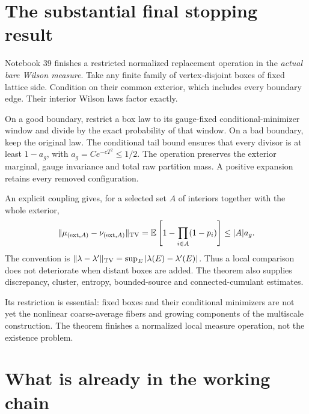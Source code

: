 \documentclass[11pt]{article}
\theoremstyle{remark}
\begin{document}
\section*{The substantial final stopping result}

Notebook 39 finishes a restricted normalized replacement
operation in the \emph{actual bare Wilson measure}.
Take any finite family of vertex-disjoint boxes of
fixed lattice side. Condition on their common exterior,
which includes every boundary edge. Their interior
Wilson laws factor exactly.

On a good boundary, restrict a box law to its
gauge-fixed conditional-minimizer window and divide
by the exact probability of that window. On a bad
boundary, keep the original law. The conditional
tail bound ensures that every divisor is at least
\(1-a_g\), with \(a_g=Ce^{-cT^2}\le1/2\).
The operation preserves the exterior marginal,
gauge invariance and total raw partition mass.
A positive expansion retains every removed
configuration.

An explicit coupling gives, for a selected set
\(A\) of interiors together with the whole exterior,
\[
 \|\mu_{({\rm ext},A)}-\nu_{({\rm ext},A)}\|_{\rm TV}
 =\mathbb E\left[1-\prod_{i\in A}(1-p_i)\right]
 \le |A|a_g.
\]
The convention is \(\|\lambda-\lambda'\|_{\rm TV}
=\sup_E|\lambda(E)-\lambda'(E)|\). Thus a local
comparison does not deteriorate when distant
boxes are added. The theorem also supplies
discrepancy, cluster, entropy, bounded-source
and connected-cumulant estimates.

Its restriction is essential: fixed boxes and
their conditional minimizers are not yet the
nonlinear coarse-average fibers and growing
components of the multiscale construction.
The theorem finishes a normalized local
measure operation, not the existence problem.

\section*{What is already in the working chain}
\end{document}
